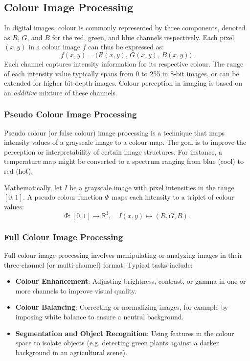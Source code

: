 \documentclass[a4paper,12pt]{article}
\begin{document}
\subsection{Colour Image Processing}

In digital images, colour is commonly represented by three components, denoted as \(R\), \(G\), and \(B\) for the red, green, and blue channels respectively. Each pixel \((x, y)\) in a colour image \(f\) can thus be expressed as:
\[
f(x, y) = \bigl(R(x, y),\, G(x, y),\, B(x, y)\bigr).
\]
Each channel captures intensity information for its respective colour. The range of each intensity value typically spans from 0 to 255 in 8-bit images, or can be extended for higher bit-depth images. Colour perception in imaging is based on an \emph{additive} mixture of these channels.

\subsubsection{Pseudo Colour Image Processing}

Pseudo colour (or false colour) image processing is a technique that maps intensity values of a grayscale image to a colour map. The goal is to improve the perception or interpretability of certain image structures. For instance, a temperature map might be converted to a spectrum ranging from blue (cool) to red (hot).

Mathematically, let \(I\) be a grayscale image with pixel intensities in the range \([0, 1]\). A pseudo colour function \(\Phi\) maps each intensity to a triplet of colour values:
\[
\Phi: [0,1] \rightarrow \mathbb{R}^3, \quad I(x,y) \mapsto (R, G, B).
\]

\subsubsection{Full Colour Image Processing}

Full colour image processing involves manipulating or analyzing images in their three-channel (or multi-channel) format. Typical tasks include:

\begin{itemize}
    \item \textbf{Colour Enhancement}: Adjusting brightness, contrast, or gamma in one or more channels to improve visual quality.
    \item \textbf{Colour Balancing}: Correcting or normalizing images, for example by imposing white balance to ensure a neutral background.
    \item \textbf{Segmentation and Object Recognition}: Using features in the colour space to isolate objects (e.g. detecting green plants against a darker background in an agricultural scene).
\end{itemize}
\end{document}
